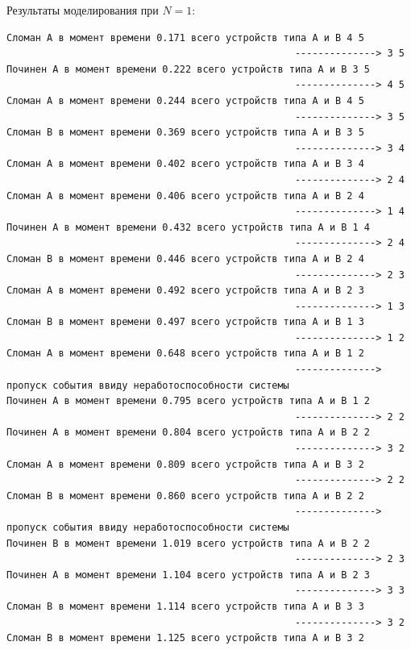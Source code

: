 Результаты моделирования при $N=1$:
\scriptsize
\begin{verbatim}
Сломан A в момент времени 0.171 всего устройств типа А и В 4 5
                                                  --------------> 3 5
Починен A в момент времени 0.222 всего устройств типа А и В 3 5
                                                  --------------> 4 5
Сломан A в момент времени 0.244 всего устройств типа А и В 4 5
                                                  --------------> 3 5
Сломан B в момент времени 0.369 всего устройств типа А и В 3 5
                                                  --------------> 3 4
Сломан A в момент времени 0.402 всего устройств типа А и В 3 4
                                                  --------------> 2 4
Сломан A в момент времени 0.406 всего устройств типа А и В 2 4
                                                  --------------> 1 4
Починен A в момент времени 0.432 всего устройств типа А и В 1 4
                                                  --------------> 2 4
Сломан B в момент времени 0.446 всего устройств типа А и В 2 4
                                                  --------------> 2 3
Сломан A в момент времени 0.492 всего устройств типа А и В 2 3
                                                  --------------> 1 3
Сломан B в момент времени 0.497 всего устройств типа А и В 1 3
                                                  --------------> 1 2
Сломан A в момент времени 0.648 всего устройств типа А и В 1 2
                                                  --------------> пропуск события ввиду неработоспособности системы
Починен A в момент времени 0.795 всего устройств типа А и В 1 2
                                                  --------------> 2 2
Починен A в момент времени 0.804 всего устройств типа А и В 2 2
                                                  --------------> 3 2
Сломан A в момент времени 0.809 всего устройств типа А и В 3 2
                                                  --------------> 2 2
Сломан B в момент времени 0.860 всего устройств типа А и В 2 2
                                                  --------------> пропуск события ввиду неработоспособности системы
Починен B в момент времени 1.019 всего устройств типа А и В 2 2
                                                  --------------> 2 3
Починен A в момент времени 1.104 всего устройств типа А и В 2 3
                                                  --------------> 3 3
Сломан B в момент времени 1.114 всего устройств типа А и В 3 3
                                                  --------------> 3 2
Сломан B в момент времени 1.125 всего устройств типа А и В 3 2

\end{verbatim}
